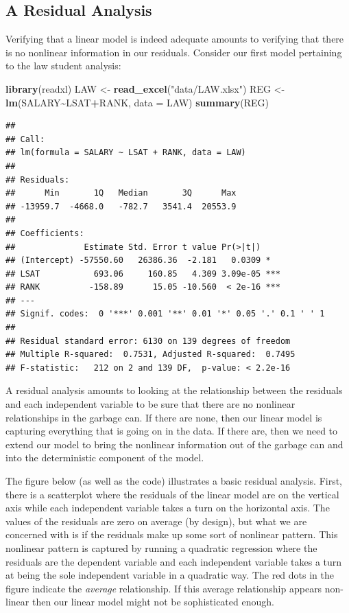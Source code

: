 \documentclass[
]{book}
\newenvironment{Shaded}{\begin{snugshade}}{\end{snugshade}}
\newcommand{\AttributeTok}[1]{\textcolor[rgb]{0.13,0.29,0.53}{#1}}
\newcommand{\FunctionTok}[1]{\textcolor[rgb]{0.13,0.29,0.53}{\textbf{#1}}}
\newcommand{\NormalTok}[1]{#1}
\newcommand{\OtherTok}[1]{\textcolor[rgb]{0.56,0.35,0.01}{#1}}
\newcommand{\SpecialCharTok}[1]{\textcolor[rgb]{0.81,0.36,0.00}{\textbf{#1}}}
\newcommand{\StringTok}[1]{\textcolor[rgb]{0.31,0.60,0.02}{#1}}
\begin{document}
\subsection*{A Residual Analysis}\label{a-residual-analysis}

Verifying that a linear model is indeed adequate amounts to verifying that there is no nonlinear information in our residuals. Consider our first model pertaining to the law student analysis:

\begin{Shaded}
\begin{Highlighting}[]
\FunctionTok{library}\NormalTok{(readxl)}
\NormalTok{LAW }\OtherTok{\textless{}{-}} \FunctionTok{read\_excel}\NormalTok{(}\StringTok{"data/LAW.xlsx"}\NormalTok{)}
\NormalTok{REG }\OtherTok{\textless{}{-}} \FunctionTok{lm}\NormalTok{(SALARY}\SpecialCharTok{\textasciitilde{}}\NormalTok{LSAT}\SpecialCharTok{+}\NormalTok{RANK, }\AttributeTok{data =}\NormalTok{ LAW)}
\FunctionTok{summary}\NormalTok{(REG)}
\end{Highlighting}
\end{Shaded}

\begin{verbatim}
## 
## Call:
## lm(formula = SALARY ~ LSAT + RANK, data = LAW)
## 
## Residuals:
##      Min       1Q   Median       3Q      Max 
## -13959.7  -4668.0   -782.7   3541.4  20553.9 
## 
## Coefficients:
##              Estimate Std. Error t value Pr(>|t|)    
## (Intercept) -57550.60   26386.36  -2.181   0.0309 *  
## LSAT           693.06     160.85   4.309 3.09e-05 ***
## RANK          -158.89      15.05 -10.560  < 2e-16 ***
## ---
## Signif. codes:  0 '***' 0.001 '**' 0.01 '*' 0.05 '.' 0.1 ' ' 1
## 
## Residual standard error: 6130 on 139 degrees of freedom
## Multiple R-squared:  0.7531, Adjusted R-squared:  0.7495 
## F-statistic:   212 on 2 and 139 DF,  p-value: < 2.2e-16
\end{verbatim}

A residual analysis amounts to looking at the relationship between the residuals and each independent variable to be sure that there are no nonlinear relationships in the garbage can. If there are none, then our linear model is capturing everything that is going on in the data. If there are, then we need to extend our model to bring the nonlinear information out of the garbage can and into the deterministic component of the model.

The figure below (as well as the code) illustrates a basic residual analysis. First, there is a scatterplot where the residuals of the linear model are on the vertical axis while each independent variable takes a turn on the horizontal axis. The values of the residuals are zero on average (by design), but what we are concerned with is if the residuals make up some sort of nonlinear pattern. This nonlinear pattern is captured by running a quadratic regression where the residuals are the dependent variable and each independent variable takes a turn at being the sole independent variable in a quadratic way. The red dots in the figure indicate the \emph{average} relationship. If this average relationship appears non-linear then our linear model might not be sophisticated enough.
\end{document}

